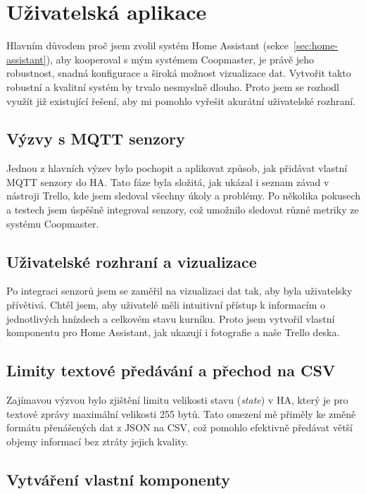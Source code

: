 \section{Uživatelská aplikace}\label{sec:tvorba-gui-rozhrani}
Hlavním důvodem proč jsem zvolil systém Home Assistant (sekce~\ref{sec:home-assistant}), aby kooperoval s mým systémem Coopmaster, je právě jeho robustnost, snadná konfigurace a široká možnost vizualizace dat.
Vytvořit takto robustní a kvalitní systém by trvalo nesmyslně dlouho.
Proto jsem se rozhodl využít již existující řešení, aby mi pomohlo vyřešit akurátní uživatelské rozhraní. \newline

\subsection*{Výzvy s MQTT senzory}

Jednou z hlavních výzev bylo pochopit a aplikovat způsob, jak přidávat vlastní MQTT senzory do HA. Tato fáze byla složitá, jak ukázal i seznam závad v nástroji Trello, kde jsem sledoval všechny úkoly a problémy.
Po několika pokusech a testech jsem úspěšně integroval senzory, což umožnilo sledovat různé metriky ze systému Coopmaster.

\subsection*{Uživatelské rozhraní a vizualizace}

Po integraci senzorů jsem se zaměřil na vizualizaci dat tak, aby byla uživatelsky přívětivá.
Chtěl jsem, aby uživatelé měli intuitivní přístup k informacím o jednotlivých hnízdech a celkovém stavu kurníku.
Proto jsem vytvořil vlastní komponentu pro Home Assistant, jak ukazují i fotografie a naše Trello deska.

\subsection*{Limity textové předávání a přechod na CSV}

Zajímavou výzvou bylo zjištění limitu velikosti stavu (\textit{state}) v HA, který je pro textové zprávy maximální velikosti 255 bytů.
Tato omezení mě přiměly ke změně formátu přenášených dat z JSON na CSV, což pomohlo efektivně předávat větší objemy informací bez ztráty jejich kvality.

\subsection*{Vytváření vlastní komponenty}

